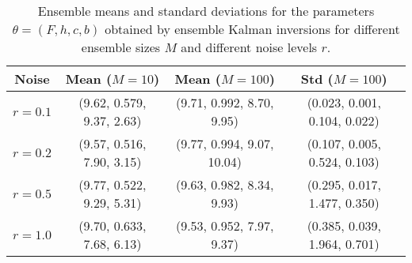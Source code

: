 \documentclass[draft]{agujournal}
\begin{document}
\begin{table}[ht]
\centering
\begin{tabular}{l|ccc}
  \hline
\multicolumn{1}{c|}{Noise} & Mean ($M=10$) & Mean ($M=100$) & Std ($M=100$) \\ 
  \hline
$r=0.1$ & (9.62, 0.579, 9.37, 2.63) & (9.71, 0.992, 8.70, 9.95) & (0.023, 0.001, 0.104, 0.022) \\ 
$r=0.2$ & (9.57, 0.516, 7.90, 3.15) & (9.77, 0.994, 9.07, 10.04) & (0.107, 0.005, 0.524, 0.103) \\ 
$r=0.5$ & (9.77, 0.522, 9.29, 5.31) & (9.63, 0.982, 8.34, 9.93) & (0.295, 0.017, 1.477, 0.350) \\
$r=1.0$ & (9.70, 0.633, 7.68, 6.13) & (9.53, 0.952, 7.97, 9.37) & (0.385, 0.039, 1.964, 0.701) \\
   \hline
\end{tabular}
\caption{Ensemble means and standard deviations for the parameters $\theta=(F, h, c, b)$ obtained by ensemble Kalman inversions for different ensemble sizes $M$ and different noise levels $r$.} 
\label{tab:EnKF_opt}
\end{table}
\end{document}

